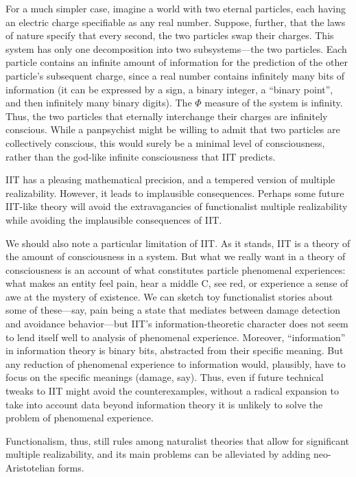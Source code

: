 For a much simpler case, imagine a world with two eternal particles, each having an electric charge specifiable
as any real number. Suppose, further, that the laws of nature specify that every second, the two particles swap their charges. This system has only one decomposition into two subsystems---the two particles. Each particle contains 
an infinite amount of information for the prediction of the other particle's subsequent charge, since a real
number contains infinitely many bits of information (it can be expressed by a sign, a binary integer, a ``binary 
point'', and then infinitely many binary digits). The $\Phi$ measure of the system is infinity. Thus, the two 
particles that eternally interchange their charges are infinitely conscious. While a panpsychist might be willing to 
admit that two particles are collectively conscious, this would surely be a minimal level of consciousness, rather than 
the god-like infinite consciousness that IIT predicts.

IIT has a pleasing mathematical precision, and a tempered version of multiple realizability. However, it leads to 
implausible consequences. Perhaps some future IIT-like theory will avoid the extravagancies of functionalist multiple
realizability while avoiding the implausible consequences of IIT.

We should also note a particular 
limitation of IIT. As it stands, IIT is a theory of the amount of consciousness in a system. But what we really 
want in a theory of consciousness is an account of what constitutes particle phenomenal experiences: what makes 
an entity feel pain, hear a middle C, see red, or experience a sense of awe at the mystery of existence. We can 
sketch toy functionalist stories about some of these---say, pain being a state that mediates between damage detection
and avoidance behavior---but IIT's information-theoretic character does not seem to lend itself well to analysis of 
phenomenal experience. Moreover, ``information'' in information theory is binary bits, abstracted from their specific 
meaning. But any reduction of phenomenal experience to information would, plausibly, have to focus on the specific 
meanings (damage, say). Thus, even if future technical tweaks to IIT might avoid the counterexamples, without a radical
expansion to take into account data beyond information theory it is unlikely to solve the problem of phenomenal
experience.

Functionalism, thus, still rules among naturalist theories that allow for significant multiple realizability,
and its main problems can be alleviated by adding neo-Aristotelian forms.

